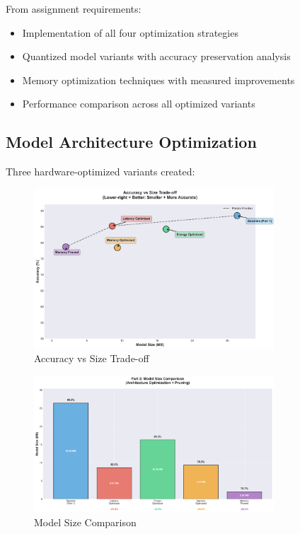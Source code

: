 \documentclass[10pt, a4paper]{article}
\begin{document}
From assignment requirements:
\begin{itemize}
    \item Implementation of all four optimization strategies
    \item Quantized model variants with accuracy preservation analysis
    \item Memory optimization techniques with measured improvements
    \item Performance comparison across all optimized variants
\end{itemize}

\subsection{Model Architecture Optimization}

Three hardware-optimized variants created:

\begin{figure}[H]
\centering
\includegraphics[width=0.8\textwidth]{charts/part2_accuracy_vs_size.png}
\caption{Accuracy vs Size Trade-off}
\end{figure}

\begin{figure}[H]
\centering
\includegraphics[width=0.8\textwidth]{charts/part2_model_size_comparison.png}
\caption{Model Size Comparison}
\end{figure}
\end{document}
